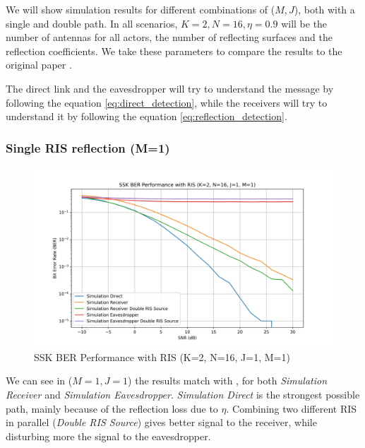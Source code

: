 We will show simulation results for different combinations of ($M, J$), both with a single and double path. In all scenarios, $K = 2, N = 16, \eta = 0.9$ will be the number of antennas for all actors, the number of reflecting surfaces and the reflection coefficients. We take these parameters to compare the results to the original paper \cite{9328149}.

The direct link and the eavesdropper will try to understand the message by following the equation \eqref{eq:direct_detection}, while the receivers will try to understand it by following the equation \eqref{eq:reflection_detection}.

\subsubsection{Single RIS reflection (M=1)}

\begin{figure}[H]
  \centering
  \includegraphics[width=0.9\linewidth]{imgs/ber-simulations/SSK BER Performance with RIS (K=2, N=16, J=1, M=1).png}
  \caption{SSK BER Performance with RIS (K=2, N=16, J=1, M=1)}
  \label{fig:simulation_j1_m1}
\end{figure}

We can see in ($M=1, J=1$) the results match with \cite{9328149}, for both \textit{Simulation Receiver} and \textit{Simulation Eavesdropper}.
\textit{Simulation Direct} is the strongest possible path, mainly because of the reflection loss due to $\eta$.
Combining two different RIS in parallel (\textit{Double RIS Source}) gives better signal to the receiver, while disturbing more the signal to the eavesdropper.

